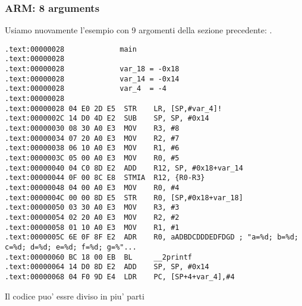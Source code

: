 \subsubsection{ARM: 8 arguments}

Usiamo nuovamente l'esempio con 9 argomenti della sezione precedente: .



\myparagraph{\OptimizingKeilVI: \ARMMode}

\begin{lstlisting}
.text:00000028             main
.text:00000028
.text:00000028             var_18 = -0x18
.text:00000028             var_14 = -0x14
.text:00000028             var_4  = -4
.text:00000028
.text:00000028 04 E0 2D E5  STR    LR, [SP,#var_4]!
.text:0000002C 14 D0 4D E2  SUB    SP, SP, #0x14
.text:00000030 08 30 A0 E3  MOV    R3, #8
.text:00000034 07 20 A0 E3  MOV    R2, #7
.text:00000038 06 10 A0 E3  MOV    R1, #6
.text:0000003C 05 00 A0 E3  MOV    R0, #5
.text:00000040 04 C0 8D E2  ADD    R12, SP, #0x18+var_14
.text:00000044 0F 00 8C E8  STMIA  R12, {R0-R3}
.text:00000048 04 00 A0 E3  MOV    R0, #4
.text:0000004C 00 00 8D E5  STR    R0, [SP,#0x18+var_18]
.text:00000050 03 30 A0 E3  MOV    R3, #3
.text:00000054 02 20 A0 E3  MOV    R2, #2
.text:00000058 01 10 A0 E3  MOV    R1, #1
.text:0000005C 6E 0F 8F E2  ADR    R0, aADBDCDDDEDFDGD ; "a=%d; b=%d; c=%d; d=%d; e=%d; f=%d; g=%"...
.text:00000060 BC 18 00 EB  BL     __2printf
.text:00000064 14 D0 8D E2  ADD    SP, SP, #0x14
.text:00000068 04 F0 9D E4  LDR    PC, [SP+4+var_4],#4
\end{lstlisting}

Il codice puo' essre diviso in piu' parti

